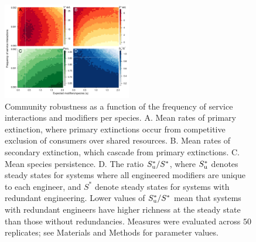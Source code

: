 \documentclass[twocolumn,preprintnumbers,amsmath,amssymb,superscriptaddress]{revtex4}
\begin{document}
\vspace{-4mm}
\begin{figure}[h!]
\centering
\includegraphics[width=0.5\textwidth]{fig_engineers4.pdf}
\vspace{-8mm}
\caption{
Community robustness as a function of the frequency of service interactions and modifiers per species.
A. Mean rates of primary extinction, where primary extinctions occur from competitive exclusion of consumers over shared resources.
B. Mean rates of secondary extinction, which cascade from primary extinctions.
C. Mean species persistence.
D. The ratio $S^*_{\rm u}/S^*$, where $S^*_{\rm u}$ denotes steady states for systems where all engineered modifiers are unique to each engineer, and $S^*$ denote steady states for systems with redundant engineering. Lower values of $S^*_{\rm u}/S^*$ mean that systems with redundant engineers have higher richness at the steady state than those without redundancies.
Measures were evaluated across $50$ replicates; see Materials and Methods for parameter values.
\vspace{-5mm}
}
\label{fig:engineers}
\end{figure}
\end{document}
